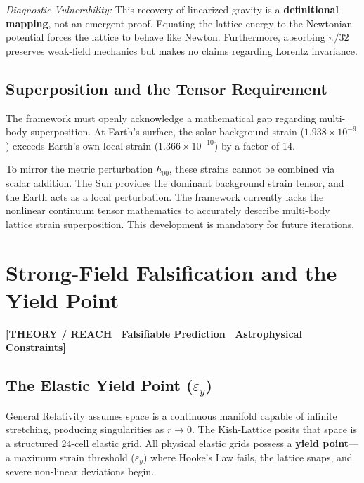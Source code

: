\documentclass[11pt, letterpaper, openany]{book}
\begin{document}
\textit{Diagnostic Vulnerability:} This recovery of linearized gravity is a \textbf{definitional mapping}, not an emergent proof. Equating the lattice energy to the Newtonian potential forces the lattice to behave like Newton. Furthermore, absorbing $\pi/32$ preserves weak-field mechanics but makes no claims regarding Lorentz invariance.

\section{Superposition and the Tensor Requirement}

The framework must openly acknowledge a mathematical gap regarding multi-body superposition. At Earth's surface, the solar background strain ($1.938 \times 10^{-9}$) exceeds Earth's own local strain ($1.366 \times 10^{-10}$) by a factor of 14. 

To mirror the metric perturbation $h_{00}$, these strains cannot be combined via scalar addition. The Sun provides the dominant background strain tensor, and the Earth acts as a local perturbation. The framework currently lacks the nonlinear continuum tensor mathematics to accurately describe multi-body lattice strain superposition. This development is mandatory for future iterations.

\chapter{Strong-Field Falsification and the Yield Point}

\begin{center}
{\color{theorytag}\textbf{[THEORY / REACH \textbullet\ Falsifiable Prediction \textbullet\ Astrophysical Constraints]}}
\end{center}

\section{The Elastic Yield Point ($\varepsilon_y$)}

General Relativity assumes space is a continuous manifold capable of infinite stretching, producing singularities as $r \to 0$. The Kish-Lattice posits that space is a structured 24-cell elastic grid. All physical elastic grids possess a \textbf{yield point}—a maximum strain threshold ($\varepsilon_y$) where Hooke's Law fails, the lattice snaps, and severe non-linear deviations begin.
\end{document}
